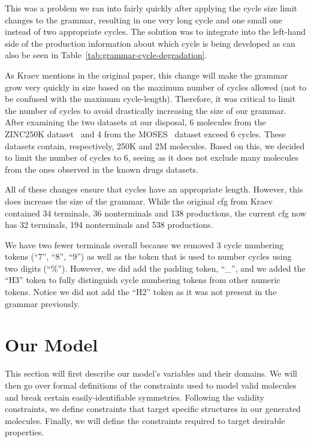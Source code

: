 \documentclass[../Document.tex]{subfiles}
\begin{document}
This was a problem we ran into fairly quickly after applying the cycle size limit changes to the grammar, resulting in one very long cycle and one small one instead of two appropriate cycles. The solution was to integrate into the left-hand side of the production information about which cycle is being developed as can also be seen in Table~\ref{tab:grammar-cycle-degradation}.

As Kraev mentions in the original paper\cite{kraev2018grammars}, this change will make the grammar grow very quickly in size based on the maximum number of cycles allowed (not to be confused with the maximum cycle-length).
Therefore, it was critical to limit the number of cycles to avoid drastically increasing the size of our grammar.
After examining the two datasets at our disposal, 6 molecules from the ZINC250K dataset~\cite{Akhmetshin2021} and 4 from the MOSES~\cite{MOSES} dataset exceed 6 cycles. These datasets contain, respectively, 250K and 2M molecules. Based on this, we decided to limit the number of cycles to 6, seeing as it does not exclude many molecules from the ones observed in the known drugs datasets.

All of these changes ensure that cycles have an appropriate length. However, this does increase the size of the grammar. While the original \gls{cfg} from Kraev contained 34 terminals, 36 nonterminals and 138 productions, the current \gls{cfg} now has 32 terminals, 194 nonterminals and 538 productions.

We have two fewer terminals overall because we removed 3 cycle numbering tokens (``7'', ``8'', ``9'') as well as the token that is used to number cycles using two digits (``\%''). However, we did add the padding token, ``\_'', and we added the ``H3'' token to fully distinguish cycle numbering tokens from other numeric tokens. Notice we did not add the ``H2'' token as it was not present in the grammar previously.


\section{Our Model}
This section will first describe our model's variables and their domains.
We will then go over formal definitions of the constraints used to model valid molecules and break certain easily-identifiable symmetries.
Following the validity constraints, we define constraints that target specific structures in our generated molecules.
Finally, we will define the constraints required to target desirable properties.
\end{document}
